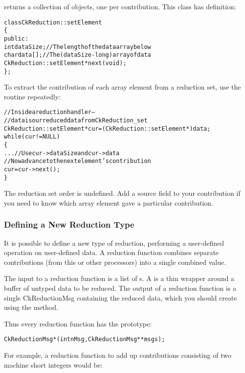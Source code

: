  returns a collection of 
objects, one per contribution.  This class has definition:

\begin{alltt}
class CkReduction::setElement 
\{
public:
  int dataSize;//The length of the data array below
  char data[];//The (dataSize-long) array of data
  CkReduction::setElement *next(void);
\};
\end{alltt}

To extract the contribution of each array element from a reduction set, use the
 routine repeatedly:

\begin{alltt}
  //Inside a reduction handler-- 
  //  data is our reduced data from CkReduction_set
  CkReduction::setElement *cur=(CkReduction::setElement *)data;
  while (cur!=NULL)
  \{
    ... //Use cur->dataSize and cur->data
    //Now advance to the next element's contribution
    cur=cur->next();
  \}
\end{alltt}

The reduction set order is undefined.  Add a source field to your contribution
if you need to know which array element gave a particular contribution.

\subsubsection{Defining a New Reduction Type}

It is possible to define a new type of reduction, performing a 
user-defined operation on user-defined data.  A reduction function
combines separate contributions (from this or other processors)
into a single combined value.

The input to a reduction function is a list of s.
A  is a thin wrapper around a buffer of untyped data
to be reduced.  
The output of a reduction function is a single CkReductionMsg
containing the reduced data, which you should create using the
 method.  

Thus every reduction function has the prototype:
\begin{alltt}
CkReductionMsg *(int nMsg,CkReductionMsg **msgs);
\end{alltt}

For example, a reduction function to add up contributions 
consisting of two machine short integers would be:


